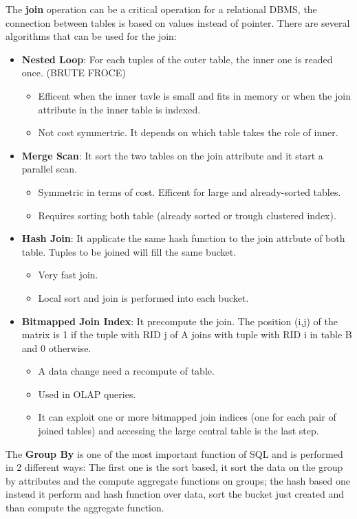 \documentclass[12pt]{article}
\begin{document}
The \textbf{join} operation can be a critical operation for a relational DBMS, the connection between tables is based on values instead of pointer. There are several algorithms that can be used for the join:
\begin{itemize}
  \item \textbf{Nested Loop}: For each tuples of the outer table, the inner one is readed once. (BRUTE FROCE)
  \begin{itemize}
    \item Efficent when the inner tavle is small and fits in memory or when the join attribute in the inner table is indexed.
    \item Not cost symmertric. It depends on which table takes the role of inner.
  \end{itemize}
  \item \textbf{Merge Scan}: It sort the two tables on the join attribute and it start a parallel scan.
  \begin{itemize}
    \item Symmetric in terms of cost. Efficent for large and already-sorted tables.
    \item Requires sorting both table (already sorted or trough clustered index).
  \end{itemize}
  \item \textbf{Hash Join}: It applicate the same hash function to the join attrbute of both table. Tuples to be joined will fill the same bucket.
  \begin{itemize}
    \item Very fast join.
    \item Local sort and join is performed into each bucket.
  \end{itemize}
  \item \textbf{Bitmapped Join Index}: It precompute the join. The position (i,j) of the matrix is 1 if the tuple with RID j of A joins with tuple with RID i in table B and 0 otherwise.
  \begin{itemize}
    \item A data change need a recompute of table.
    \item Used in OLAP queries.
    \item It can exploit one or more bitmapped join indices (one for each pair of joined tables) and accessing the large central table is the last step.
  \end{itemize}
\end{itemize}

The \textbf{Group By} is one of the most important function of SQL and is performed in 2 different ways: The first one is the sort based, it sort the data on the group by attributes and the compute aggregate functions on groups; the hash based one instead it perform and hash function over data, sort the bucket just created and than compute the aggregate function.
\end{document}
